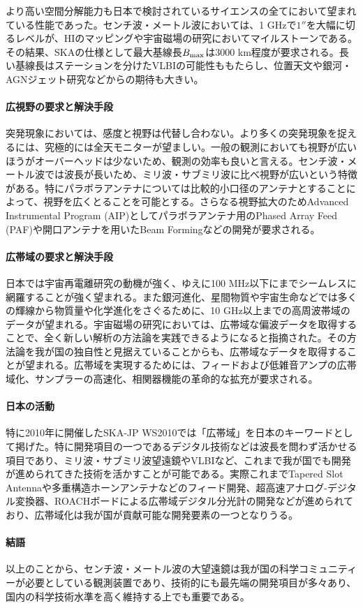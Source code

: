 より高い空間分解能力も日本で検討されているサイエンスの全てにおいて望まれている性能であった。センチ波・メートル波においては、1 GHzで$1''$を大幅に切るレベルが、HIのマッピングや宇宙磁場の研究においてマイルストーンである。その結果、SKAの仕様として最大基線長$B_{\rm max}$は3000 km程度が要求される。長い基線長はステーションを分けたVLBIの可能性ももたらし、位置天文や銀河・AGNジェット研究などからの期待も大きい。

\paragraph{広視野の要求と解決手段}

突発現象においては、感度と視野は代替し合わない。より多くの突発現象を捉えるには、究極的には全天モニターが望ましい。一般の観測においても視野が広いほうがオーバーヘッドは少ないため、観測の効率も良いと言える。センチ波・メートル波では波長が長いため、ミリ波・サブミリ波に比べ視野が広いという特徴がある。特にパラボラアンテナについては比較的小口径のアンテナとすることによって、視野を広くとることを可能とする。さらなる視野拡大のためAdvanced Instrumental Program (AIP)としてパラボラアンテナ用のPhased Array Feed (PAF)や開口アンテナを用いたBeam Formingなどの開発が要求される。

\paragraph{広帯域の要求と解決手段}

日本では宇宙再電離研究の動機が強く、ゆえに100 MHz以下にまでシームレスに網羅することが強く望まれる。また銀河進化、星間物質や宇宙生命などでは多くの輝線から物質量や化学進化をさぐるために、10 GHz以上までの高周波帯域のデータが望まれる。宇宙磁場の研究においては、広帯域な偏波データを取得することで、全く新しい解析の方法論を実践できるようになると指摘された。その方法論を我が国の独自性と見据えていることからも、広帯域なデータを取得することが望まれる。広帯域を実現するためには、フィードおよび低雑音アンプの広帯域化、サンプラーの高速化、相関器機能の革命的な拡充が要求される。

\paragraph{日本の活動}

特に2010年に開催したSKA-JP WS2010では「広帯域」を日本のキーワードとして掲げた。特に開発項目の一つであるデジタル技術などは波長を問わず活かせる項目であり、ミリ波・サブミリ波望遠鏡やVLBIなど、これまで我が国でも開発が進められてきた技術を活かすことが可能である。実際これまでTapered Slot Antennaや多重構造ホーンアンテナなどのフィード開発、超高速アナログ-デジタル変換器、ROACHボードによる広帯域デジタル分光計の開発などが進められており、広帯域化は我が国が貢献可能な開発要素の一つとなりうる。

\paragraph{結語}

以上のことから、センチ波・メートル波の大望遠鏡は我が国の科学コミュニティーが必要としている観測装置であり、技術的にも最先端の開発項目が多々あり、国内の科学技術水準を高く維持する上でも重要である。

